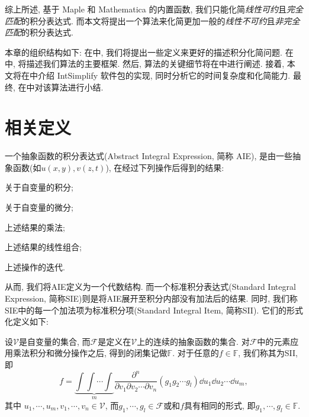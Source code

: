 综上所述, 基于 Maple 和 Mathematica 的内置函数, 我们只能化简\emph{线性可约}且\emph{完全匹配}的积分表达式. 而本文将提出一个算法来化简更加一般的\emph{线性不可约}且\emph{非完全匹配}的积分表达式.

本章的组织结构如下: 在中, 我们将提出一些定义来更好的描述积分化简问题. 在中, 将描述我们算法的主要框架. 然后, 算法的关键细节将在中进行阐述. 接着, 本文将在中介绍 IntSimplify 软件包的实现, 同时分析它的时间复杂度和化简能力. 最终, 在中对该算法进行小结.

\section{相关定义}\label{Definitions-03}
\begin{definition}
一个抽象函数的积分表达式(Abstract Integral Expression, 简称 AIE), 是由一些抽象函数(如$u(x,y),v(z,t)$), 在经过下列操作后得到的结果:
\begin{compactenum}[(1) ]
\item 关于自变量的积分;
\item 关于自变量的微分;
\item 上述结果的乘法;
\item 上述结果的线性组合;
\item 上述操作的迭代.
\end{compactenum}
\end{definition}

从而, 我们将AIE定义为一个代数结构. 而一个标准积分表达式(Standard Integral Expression, 简称SIE)则是将AIE展开至积分内部没有加法后的结果. 同时, 我们称SIE中的每一个加法项为标准积分项(Standard Integral Item, 简称SII). 它们的形式化定义如下:
\begin{definition}
设$\mathcal V$是自变量的集合, 而$\mathcal F$是定义在$\mathcal V$上的连续的抽象函数的集合. 对$\mathcal F$中的元素应用乘法\D 积分和微分操作之后, 得到的闭集记做$\mathbb F$. 对于任意的$f\in\mathbb{F}$, 我们称其为SII, 即
\begin{equation} 
f =\underbrace{\int\!\int\!\cdots\!\int}_m{ \frac{\partial^n}{\partial v_1 \partial v_2 \cdots \partial v_n} (g_1 g_2 \cdots g_l)\dd u_1 \dd u_2 \cdots \dd u_m}, 
\label{int_form}
\end{equation} 
其中 $u_1,\cdots,u_m,v_1,\cdots,v_n \in \mathcal V$, 而$g_1,\cdots,g_l \in \mathcal F$或和$f$具有相同的形式, 即$g_1,\cdots,g_l \in \mathbb F$.
\end{definition}

